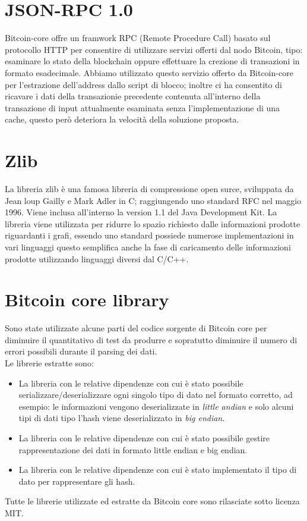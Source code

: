 \section{JSON-RPC 1.0} \label{sec:jsonrpchttp}

Bitcoin-core offre un framwork RPC (Remote Procedure Call) basato sul protocollo HTTP per consentire di utilizzare servizi offerti dal nodo Bitcoin, tipo: esaminare lo stato della blockchain oppure effettuare la crezione di transazioni in formato esadecimale.
Abbiamo utilizzato questo servizio offerto da Bitcoin-core per l'estrazione dell'address dallo script di blocco; inoltre ci ha consentito di ricavare i dati della transazionie precedente contenuta all'interno della transazione di input attualmente esaminata senza l'implementazione di una cache, questo però deteriora la velocità della soluzione proposta.

\section{Zlib} \label{sec:zlib}

La libreria zlib è una famosa libreria di compressione open surce, sviluppata da Jean loup Gailly e Mark Adler in C; raggiungendo uno standard RFC nel maggio 1996.
Viene inclusa all'interno la version 1.1 del Java Development Kit.
La libreria viene utilizzata per ridurre lo spazio richiesto dalle informazioni prodotte riguardanti i grafi, essendo uno standard possiede numerose implementazioni in vari linguaggi questo semplifica anche la fase di caricamento delle informazioni prodotte utilizzando linguaggi diversi dal C/C++.

\section{Bitcoin core library} \label{sec:bitcoinCoreLib}

Sono state utilizzate alcune parti del codice sorgente di Bitcoin core per diminuire il quantitativo di test da produrre e sopratutto diminuire il numero di errori possibili durante il parsing dei dati.\\
Le librerie estratte sono:
\begin{itemize}
  \item La libreria  con le relative dipendenze con cui è stato possibile serializzare/deserializzare ogni singolo tipo di dato nel formato corretto, ad esempio: le informazioni vengono deserializzate in \emph{little andian} e solo alcuni tipi di dati tipo l'hash viene deserializzato in \emph{big endian}.
  \item La libreria  con le relative dipendenze con cui è stato possibile gestire rappresentazione dei dati in formato little endian e big endian.
  \item La libreria  con le relative dipendenze con cui è stato implementato il tipo di dato per rappresentare gli hash.
\end{itemize}
Tutte le librerie utilizzate ed estratte da Bitcoin core sono rilasciate sotto licenza MIT.
